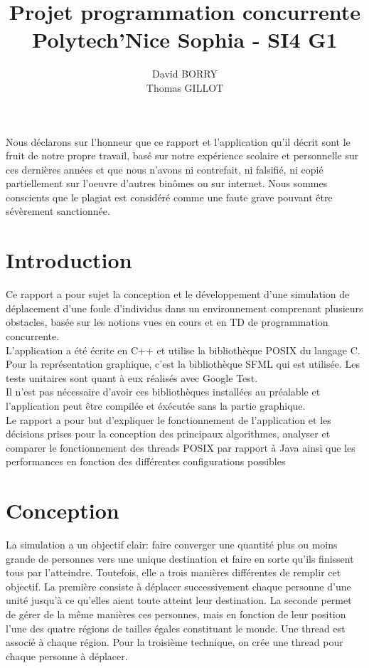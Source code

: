 \documentclass[11pt]{article} %
\title{Projet programmation concurrente \\
	Polytech'Nice Sophia - SI4 G1}
\author{David BORRY\\
		Thomas GILLOT}
\begin{document}
\maketitle

Nous déclarons sur l'honneur que ce rapport et l'application qu'il décrit sont le fruit de notre propre travail, basé sur notre expérience scolaire et personnelle sur ces dernières années et que nous n'avons ni contrefait, ni falsifié, ni copié partiellement sur l'oeuvre d'autres binômes ou sur internet. Nous sommes conscients que le plagiat est considéré comme une faute grave pouvant être sévèrement sanctionnée. 

\newpage

\section{Introduction}
Ce rapport a pour sujet la conception et le développement d'une simulation de déplacement d'une foule d'individus dans un environnement comprenant plusieurs obstacles, basée sur les notions vues en cours et en TD de programmation concurrente.  \\
L'application a été écrite en C++ et utilise la bibliothèque POSIX du langage C.
Pour la représentation graphique, c'est la bibliothèque SFML qui est utilisée.
Les tests unitaires sont quant à eux réalisés avec Google Test. \\
Il n'est pas nécessaire d'avoir ces bibliothèques installées au préalable et l'application peut être compilée et éxécutée sans la partie graphique. \\
Le rapport a pour but d'expliquer le fonctionnement de l'application et les décisions prises pour la conception des principaux algorithmes,  analyser et comparer le fonctionnement des threads POSIX par rapport à Java ainsi que les performances en fonction des différentes configurations possibles



\tableofcontents

\newpage
\section{Conception}
La simulation a un objectif clair: faire converger une quantité plus ou moins grande de personnes vers une unique destination et faire en sorte qu'ils finissent tous par l'atteindre. Toutefois, elle a trois manières différentes de remplir cet objectif. La première consiste à déplacer successivement chaque personne d'une unité jusqu'à ce qu'elles aient toute atteint leur destination. La seconde permet de gérer de la même manières ces personnes, mais en fonction de leur position l'une des quatre régions de tailles égales constituant le monde. Une thread est associé à chaque région. Pour la troisième technique, on crée une thread pour chaque personne à déplacer. 
\end{document}
